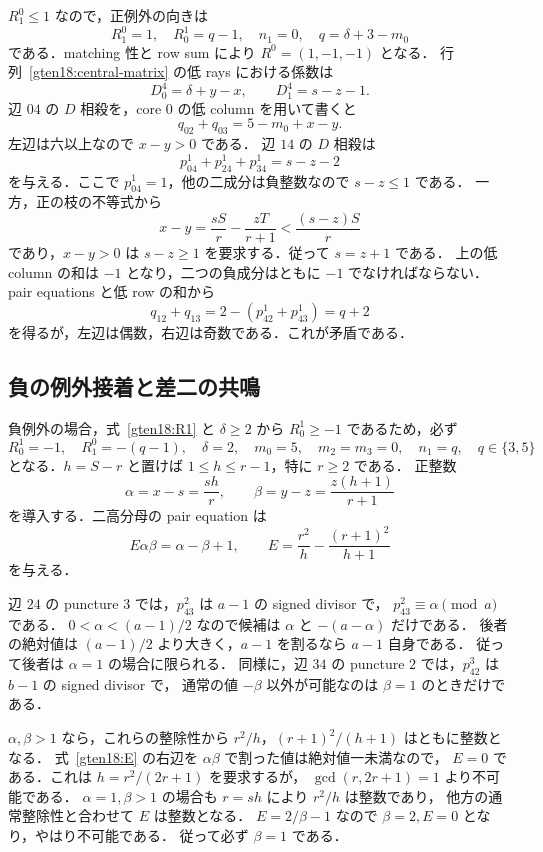 $R^0_1\le1$ なので，正例外の向きは
\[
 R^0_1=1,\quad R^1_0=q-1,\quad n_1=0,\quad
 q=\delta+3-m_0
\]
である．matching 性と row sum により $R^0=(1,-1,-1)$ となる．
行列~\eqref{gten18:central-matrix} の低 rays における係数は
\begin{equation}\label{gten18:D-low}
 D^4_0=\delta+y-x,\qquad D^4_1=s-z-1.
\end{equation}
辺 $04$ の $D$ 相殺を，core $0$ の低 column を用いて書くと
\[
 q_{02}+q_{03}=5-m_0+x-y.
\]
左辺は六以上なので $x-y>0$ である．
辺 $14$ の $D$ 相殺は
\[
 p^1_{04}+p^1_{24}+p^1_{34}=s-z-2
\]
を与える．ここで $p^1_{04}=1$，他の二成分は負整数なので $s-z\le1$ である．
一方，正の枝の不等式から
\[
 x-y=\frac{sS}{r}-\frac{zT}{r+1}
       <\frac{(s-z)S}{r}
\]
であり，$x-y>0$ は $s-z\ge1$ を要求する．従って $s=z+1$ である．
上の低 column の和は $-1$ となり，二つの負成分はともに $-1$ でなければならない．
pair equations と低 row の和から
\[
 q_{12}+q_{13}=2-(p^1_{42}+p^1_{43})=q+2
\]
を得るが，左辺は偶数，右辺は奇数である．これが矛盾である．

\subsection{負の例外接着と差二の共鳴}

負例外の場合，式~\eqref{gten18:R1} と $\delta\ge2$ から
$R^1_0\ge-1$ であるため，必ず
\begin{equation}\label{gten18:negative-exception}
 R^1_0=-1,\quad R^0_1=-(q-1),\quad
 \delta=2,\quad m_0=5,\quad m_2=m_3=0,\quad
 n_1=q,\quad q\in\{3,5\}
\end{equation}
となる．$h=S-r$ と置けば $1\le h\le r-1$，特に $r\ge2$ である．
正整数
\[
 \alpha=x-s=\frac{sh}{r},\qquad
 \beta=y-z=\frac{z(h+1)}{r+1}
\]
を導入する．二高分母の pair equation は
\begin{equation}\label{gten18:E}
 E\alpha\beta=\alpha-\beta+1,\qquad
 E=\frac{r^2}{h}-\frac{(r+1)^2}{h+1}
\end{equation}
を与える．

辺 $24$ の puncture $3$ では，$p^2_{43}$ は $a-1$ の signed divisor で，
$p^2_{43}\equiv\alpha\pmod a$ である．
$0<\alpha<(a-1)/2$ なので候補は $\alpha$ と $-(a-\alpha)$ だけである．
後者の絶対値は $(a-1)/2$ より大きく，$a-1$ を割るなら $a-1$ 自身である．
従って後者は $\alpha=1$ の場合に限られる．
同様に，辺 $34$ の puncture $2$ では，$p^3_{42}$ は $b-1$ の signed divisor で，
通常の値 $-\beta$ 以外が可能なのは $\beta=1$ のときだけである．

$\alpha,\beta>1$ なら，これらの整除性から
$r^2/h$，$(r+1)^2/(h+1)$ はともに整数となる．
式~\eqref{gten18:E} の右辺を $\alpha\beta$ で割った値は絶対値一未満なので，
$E=0$ である．これは $h=r^2/(2r+1)$ を要求するが，
$\gcd(r,2r+1)=1$ より不可能である．
$\alpha=1,\beta>1$ の場合も $r=sh$ により $r^2/h$ は整数であり，
他方の通常整除性と合わせて $E$ は整数となる．
$E=2/\beta-1$ なので $\beta=2,E=0$ となり，やはり不可能である．
従って必ず $\beta=1$ である．

